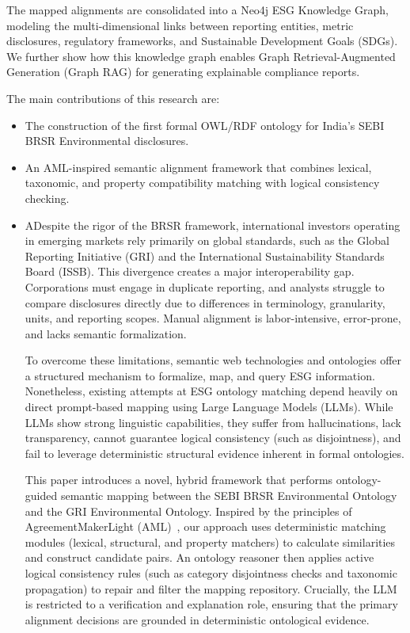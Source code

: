 \documentclass[journal,compsoc]{IEEEtran}
\begin{document}
The mapped alignments are consolidated into a Neo4j ESG Knowledge Graph, modeling the multi-dimensional links between reporting entities, metric disclosures, regulatory frameworks, and Sustainable Development Goals (SDGs). We further show how this knowledge graph enables Graph Retrieval-Augmented Generation (Graph RAG) for generating explainable compliance reports.

The main contributions of this research are:
\begin{itemize}
    \item The construction of the first formal OWL/RDF ontology for India's SEBI BRSR Environmental disclosures.
    \item An AML-inspired semantic alignment framework that combines lexical, taxonomic, and property compatibility matching with logical consistency checking.
    \item ADespite the rigor of the BRSR framework, international investors operating in emerging markets rely primarily on global standards, such as the Global Reporting Initiative (GRI) and the International Sustainability Standards Board (ISSB). This divergence creates a major interoperability gap. Corporations must engage in duplicate reporting, and analysts struggle to compare disclosures directly due to differences in terminology, granularity, units, and reporting scopes. Manual alignment is labor-intensive, error-prone, and lacks semantic formalization. 

To overcome these limitations, semantic web technologies and ontologies offer a structured mechanism to formalize, map, and query ESG information. Nonetheless, existing attempts at ESG ontology matching depend heavily on direct prompt-based mapping using Large Language Models (LLMs). While LLMs show strong linguistic capabilities, they suffer from hallucinations, lack transparency, cannot guarantee logical consistency (such as disjointness), and fail to leverage deterministic structural evidence inherent in formal ontologies.

This paper introduces a novel, hybrid framework that performs ontology-guided semantic mapping between the SEBI BRSR Environmental Ontology and the GRI Environmental Ontology. Inspired by the principles of AgreementMakerLight (AML)~\cite{aml2013}, our approach uses deterministic matching modules (lexical, structural, and property matchers) to calculate similarities and construct candidate pairs. An ontology reasoner then applies active logical consistency rules (such as category disjointness checks and taxonomic propagation) to repair and filter the mapping repository. Crucially, the LLM is restricted to a verification and explanation role, ensuring that the primary alignment decisions are grounded in deterministic ontological evidence.


\end{itemize}
\end{document}
